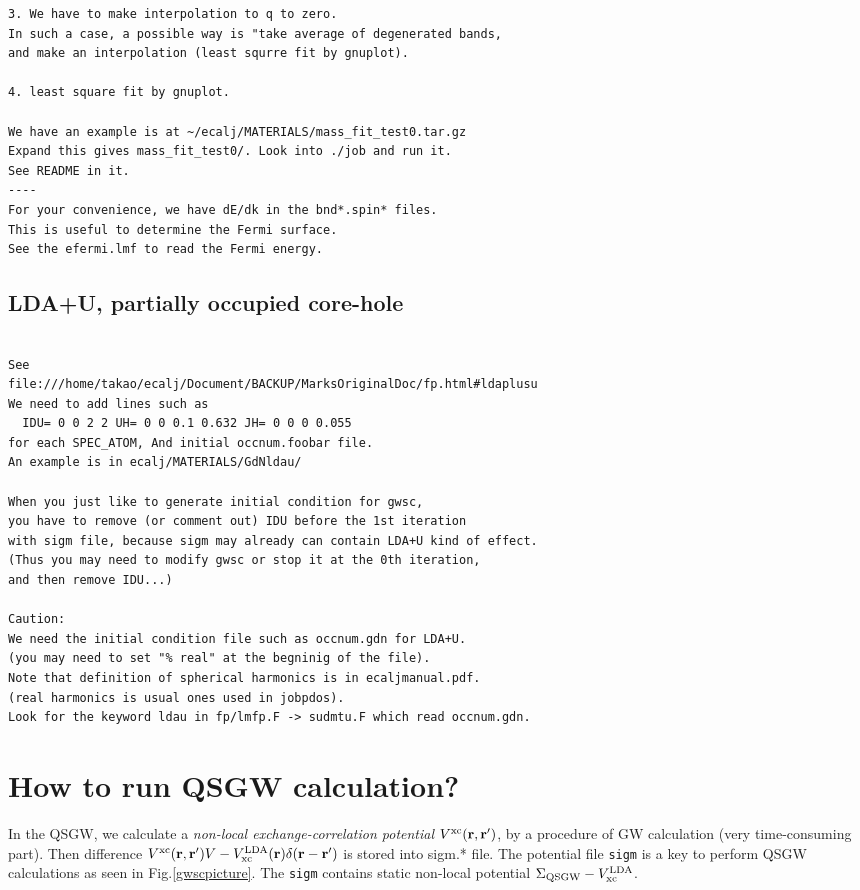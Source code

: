 \documentclass[a4paper,10pt,epsf,fleqn]{article}
\newcommand{\bfr}{{\bf r}}
\newcommand{\io}[1]{{\sf  #1}}
\begin{document}
\begin{verbatim}
3. We have to make interpolation to q to zero.
In such a case, a possible way is "take average of degenerated bands,
and make an interpolation (least squrre fit by gnuplot).

4. least square fit by gnuplot. 

We have an example is at ~/ecalj/MATERIALS/mass_fit_test0.tar.gz
Expand this gives mass_fit_test0/. Look into ./job and run it. 
See README in it.
----
For your convenience, we have dE/dk in the bnd*.spin* files.
This is useful to determine the Fermi surface.
See the efermi.lmf to read the Fermi energy.

\end{verbatim}

\subsection{LDA+U, partially occupied core-hole}

\begin{verbatim}

See
file:///home/takao/ecalj/Document/BACKUP/MarksOriginalDoc/fp.html#ldaplusu
We need to add lines such as
  IDU= 0 0 2 2 UH= 0 0 0.1 0.632 JH= 0 0 0 0.055
for each SPEC_ATOM, And initial occnum.foobar file.
An example is in ecalj/MATERIALS/GdNldau/

When you just like to generate initial condition for gwsc,
you have to remove (or comment out) IDU before the 1st iteration
with sigm file, because sigm may already can contain LDA+U kind of effect.
(Thus you may need to modify gwsc or stop it at the 0th iteration,
and then remove IDU...)

Caution: 
We need the initial condition file such as occnum.gdn for LDA+U. 
(you may need to set "% real" at the begninig of the file).
Note that definition of spherical harmonics is in ecaljmanual.pdf.
(real harmonics is usual ones used in jobpdos).
Look for the keyword ldau in fp/lmfp.F -> sudmtu.F which read occnum.gdn.

\end{verbatim}


\section{How to run  QSGW calculation?}

In the QSGW, we calculate a 
{\it non-local exchange-correlation potential} $V^{\rm xc}(\bfr,\bfr')$,
by a procedure of GW calculation (very time-consuming part).
Then difference $V^{\rm xc}(\bfr,\bfr')V-V_{\rm xc}^{\rm
LDA}(\bfr)\delta(\bfr-\bfr')$  is stored into \io{sigm.*} file. 
The potential file \verb#sigm# is a key to perform QSGW calculations as seen in
Fig.\ref{gwscpicture}. The \verb#sigm# contains static non-local potential 
$\Sigma_{\rm QSGW}-V_{\rm xc}^{\rm LDA}$. 
\end{document}
